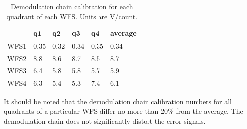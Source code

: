 \begin{table}
\centering
\caption[Demodulation chain calibration for each quadrant of each
 WFS]{Demodulation chain calibration for each quadrant of each
 WFS. Units are \micro V/count.}
\begin{tabular}{l l l l l l}
\hline
 & q1 & q2 & q3 & q4 & average \\
\hline
 WFS1  & 0.35 &   0.32 &   0.34 &   0.35 & 0.34 \\
 WFS2  & 8.8 &   8.6 &   8.7  &  8.5 & 8.7       \\
 WFS3  & 6.4 &   5.8 &   5.8 &   5.7 & 5.9     \\
 WFS4  & 6.3 &   5.4 &   5.3  &  7.4 & 6.1    \\
\hline
\end{tabular}
\label{table:demodcal}
\end{table}

It should be noted that the demodulation chain calibration numbers for
all quadrants of a particular WFS differ no more than 20\% from the
average. The demodulation chain does not significantly distort the
error signals.












